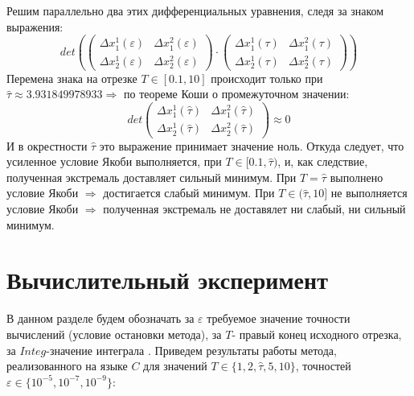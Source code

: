 \documentclass{article}
\theoremstyle{remark}
\theoremstyle{definition}
\begin{document}
Решим параллельно два этих дифференциальных уравнения, следя за знаком выражения:
$$
det\left(\left(
\begin{array}{cc}
    \Delta x_1^1(\varepsilon) & \Delta x_1^2(\varepsilon)  \\
    \Delta x_2^1(\varepsilon)& \Delta x_2^2(\varepsilon)
\end{array}\right)\cdot
\left(\begin{array}{cc}
    \Delta x_1^1(\tau) & \Delta x_1^2(\tau) \\
    \Delta x_2^1(\tau) & \Delta x_2^2(\tau)
\end{array}\right)\right)
$$
Перемена знака на отрезке $T\in[0.1,10]$ происходит только при $\widehat{\tau}\approx3.931849978933\Rightarrow$ по теореме Коши о промежуточном значении:
$$
det
\left(\begin{array}{cc}
    \Delta x_1^1(\widehat{\tau}) & \Delta x_1^2(\widehat{\tau}) \\
    \Delta x_2^1(\widehat{\tau}) & \Delta x_2^2(\widehat{\tau})
\end{array}\right)\approx0
$$
И в окрестности $\widehat{\tau}$ это выражение принимает значение ноль. Откуда следует, что усиленное условие Якоби выполняется, при $T\in[0.1,\widehat{\tau})$, и, как следствие, полученная экстремаль доставляет сильный минимум. При $T=\widehat{\tau}$ выполнено условие Якоби $\Rightarrow$ достигается слабый минимум. При $T\in(\widehat{\tau},10]$ не выполняется условие Якоби $\Rightarrow$ полученная экстремаль не доставялет ни слабый, ни сильный минимум.

\section{Вычислительный эксперимент}\label{Res}
		В данном разделе будем обозначать за $\varepsilon$ требуемое значение точности вычислений (условие остановки метода), за $T$- правый конец исходного отрезка, за $Integ$-значение интеграла . Приведем результаты работы метода, реализованного на языке $C$ для  значений $T \in \{1,2,\widehat{\tau},5,10\}$, точностей $\varepsilon \in \{10^{-5}, 10^{-7}, 10^{-9}\}$:
		
		
		
\end{document}
